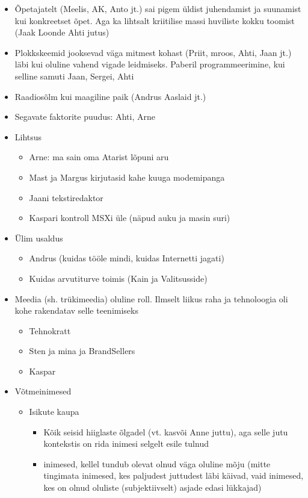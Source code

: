 \documentclass{tufte-book}
\begin{document}
\begin{itemize}
	\item Õpetajatelt (Meelis, AK, Anto jt.) sai pigem üldist juhendamist ja suunamist kui konkreetset õpet. Aga ka lihtsalt kriitilise massi huviliste kokku toomist (Jaak Loonde Ahti jutus)
	\item Plokkskeemid jooksevad väga mitmest kohast (Priit, mroos, Ahti, Jaan jt.) läbi kui oluline vahend vigade leidmiseks. Paberil programmeerimine, kui selline samuti Jaan, Sergei, Ahti
	\item Raadiosõlm kui maagiline paik (Andrus Aaslaid jt.)
	\item Segavate faktorite puudus: Ahti, Arne
	\item Lihtsus
	\begin{itemize}
		\item Arne: ma sain oma Atarist lõpuni aru
		\item Mast ja Margus kirjutasid kahe kuuga modemipanga
		\item Jaani tekstiredaktor
		\item Kaspari kontroll MSXi üle (näpud auku ja masin suri)
	\end{itemize}
	\item Ülim usaldus
	\begin{itemize}
		\item Andrus (kuidas tööle mindi, kuidas Internetti jagati)
		\item Kuidas arvutiturve toimis (Kain ja Valitsusside)
	\end{itemize}
	\item Meedia (sh. trükimeedia) oluline roll. Ilmselt liikus raha ja tehnoloogia oli kohe rakendatav selle teenimiseks
	\begin{itemize}
		\item Tehnokratt
		\item Sten ja mina ja BrandSellers
		\item Kaspar
	\end{itemize}
	\item Võtmeinimesed
	\begin{itemize}
		\item Isikute kaupa
			\begin{itemize}
				\item Kõik seisid hiiglaste õlgadel (vt. kasvõi Anne juttu), aga selle jutu kontekstis on rida inimesi selgelt esile tulnud
				\item inimesed, kellel tundub olevat olnud väga oluline mõju (mitte tingimata inimesed, kes paljudest juttudest läbi käivad, vaid inimesed, kes on olnud oluliste (subjektiivselt) asjade edasi lükkajad)

\end{itemize}
\end{itemize}
\end{itemize}
\end{document}
